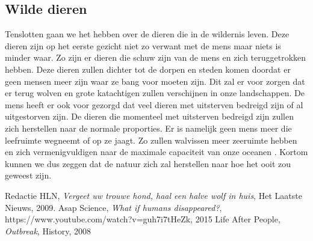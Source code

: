 \subsection{Wilde dieren}
Tenslotten gaan we het hebben over de dieren die in de wildernis leven. Deze dieren zijn op het eerste gezicht niet zo verwant met de mens maar niets is minder waar.
\newline
Zo zijn er dieren die schuw zijn van de mens en zich teruggetrokken hebben. Deze dieren zullen dichter tot de dorpen en steden komen doordat er geen mensen meer zijn waar ze bang voor moeten zijn. Dit zal er voor zorgen dat er terug wolven en grote katachtigen zullen verschijnen in onze landschappen.
\newline
De mens heeft er ook voor gezorgd dat veel dieren met uitsterven bedreigd zijn of al uitgestorven zijn. De dieren die momenteel met uitsterven bedreigd zijn zullen zich herstellen naar de normale proporties. Er is namelijk geen mens meer die leefruimte wegneemt of op ze jaagt. Zo zullen walvissen meer zeeruimte hebben en zich vermenigvuldigen naar de maximale capaciteit van onze oceanen \cite{LAPOutbreak}.
\newline
Kortom kunnen we dus zeggen dat de natuur zich zal herstellen naar hoe het ooit zou geweest zijn. 
\
\begin{thebibliography}{9}

  Redactie HLN,
  \emph{Vergeet uw trouwe hond, haal een halve wolf in huis},
  Het Laatste Nieuws,
  2009.
  Asap Science,
  \emph{What if humans disappeared?},
  https://www.youtube.com/watch?v=guh7i7tHeZk,
  2015
	Life After People,
    \emph{Outbreak},
    History,
    2008
\end{thebibliography}


